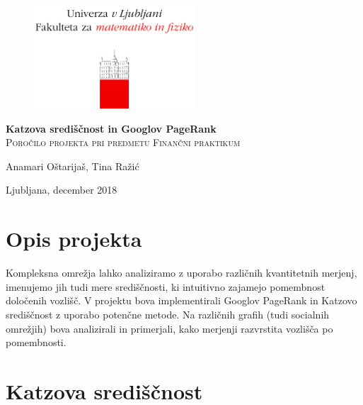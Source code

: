 \documentclass[a4paper]{article}
\begin{document}
\thispagestyle{empty}

\begin{figure}[t]
\begin{center} 
\includegraphics[width=6cm]{fmf.png}\\[4cm]
\end{center}
\end{figure}

\begin{center}
\Huge\textbf{Katzova središčnost in Googlov PageRank}\\[0.5cm]
\large\textsc{Poročilo projekta pri predmetu Finančni praktikum}\\[4cm]
\end{center}

\begin{flushleft}

\end{flushleft}
\vspace{\fill}
\begin{flushright}
Anamari Oštarijaš, Tina Ražić
\end{flushright}

\begin{flushleft}
Ljubljana, december 2018
\end{flushleft}

\newpage
\tableofcontents
\listoffigures

\newpage
\section{Opis projekta}
\hspace{4.8mm}Kompleksna omrežja lahko analiziramo z uporabo različnih kvantitetnih merjenj, imenujemo jih tudi mere središčnosti,  ki intuitivno zajamejo pomembnost določenih vozlišč. 
V projektu bova implementirali Googlov PageRank in Katzovo središčnost z uporabo potenčne metode. Na različnih grafih (tudi socialnih omrežjih) bova analizirali in primerjali, kako merjenji razvrstita vozlišča po pomembnosti. 

\section{Katzova središčnost}
\end{document}
